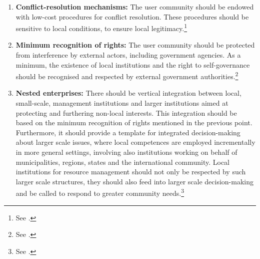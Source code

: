 \begin{enumerate}
\item {\bf Conflict-resolution mechanisms:} The user community should be endowed with low-cost procedures for conflict resolution. These procedures should be sensitive to local conditions, to ensure local legitimacy.\footnote{See \cite[100-101]{ostrom90}.}
\item {\bf Minimum recognition of rights:} The user community should be protected from interference by external actors, including government agencies. As a minimum, the existence of local institutions and the right to self-governance should be recognised and respected by external government authorities.\footnote{See \cite[101]{ostrom90}.}
\item {\bf Nested enterprises:} There should be vertical integration between local, small-scale, management institutions and larger institutions aimed at protecting and furthering non-local interests. This integration should be based on the minimum recognition of rights mentioned in the previous point. Furthermore, it should provide a template for integrated decision-making about larger scale issues, where local competences are employed incrementally in more general settings, involving also institutions working on behalf of municipalities, regions, states and the international community. Local institutions for resource management should not only be respected by such larger scale structures, they should also feed into larger scale decision-making and be called to respond to greater community needs.\footnote{See \cite[101-102]{ostrom90}.}
\end{enumerate}

